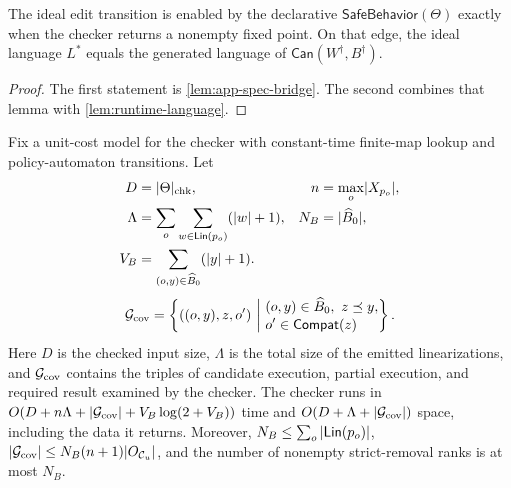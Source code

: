 \begin{corollary}
\label{cor:app-exact-boundary}
The ideal edit transition is enabled by the declarative \(\mathsf{SafeBehavior}(\Theta)\) exactly when the checker returns a nonempty fixed point.
On that edge, the ideal language \(L^*\) equals the generated language of \(\mathsf{Can}(W^\dagger,B^\dagger)\).
\end{corollary}

\begin{proof}
The first statement is \cref{lem:app-spec-bridge}.
The second combines that lemma with \cref{lem:runtime-language}.
\end{proof}

\begin{proposition}
\label{prop:app-output-complexity}
Fix a unit-cost model for the checker with constant-time finite-map lookup and policy-automaton transitions.
Let
\[
\begin{aligned}
D&=\lvert\Theta\rvert_{\rm chk},&
n&=\max_o\lvert X_{p_o}\rvert,\\
\Lambda&=\sum_o\sum_{w\in\mathsf{Lin}(p_o)}(\lvert w\rvert+1),&
N_B&=\lvert\widehat B_0\rvert,\\
V_B&=\sum_{(o,y)\in\widehat B_0}(\lvert y\rvert+1).
\end{aligned}
\]
\[
\mathcal G_{\rm cov}
=\left\{((o,y),z,o')\ \middle|\
\begin{aligned}
&(o,y)\in\widehat B_0,\ z\preceq y,\\[-2pt]
&o'\in\mathsf{Compat}(z)
\end{aligned}\right\}.
\]
Here \(D\) is the checked input size, \(\Lambda\) is the total size of the emitted linearizations, and \(\mathcal G_{\rm cov}\) contains the triples of candidate execution, partial execution, and required result examined by the checker.
The checker runs in \(O(D+n\Lambda+|\mathcal G_{\rm cov}|+V_B\log(2+V_B))\) time and \(O(D+\Lambda+|\mathcal G_{\rm cov}|)\) space, including the data it returns.
Moreover, \(N_B\leq\sum_o|\mathsf{Lin}(p_o)|\), \(|\mathcal G_{\rm cov}|\leq N_B(n+1)|O_{\mathcal C_u}|\), and the number of nonempty strict-removal ranks is at most \(N_B\).
\end{proposition}

